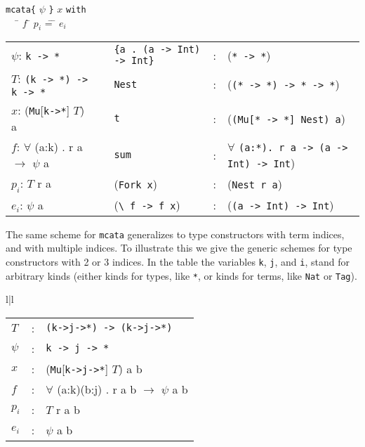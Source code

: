 {{\small
\begin{tabbing}
\verb+mcata{+ $\psi$ \verb+}+  $x$ \verb+with+ \\
\verb+  + \= $f$ \= $p_{i}$ \= =  \= $e_{i}$ \\
\end{tabbing}
\vspace*{-.15in}
\begin{tabular}{l|clcl}
$\psi$: \verb+k -> *+          & & \verb+{a . (a -> Int) -> Int}+ & : & (\verb+* -> *+)\\
$T$: \verb+(k -> *) -> k -> *+ & & \verb+Nest+ & : & (\verb+(* -> *) -> * -> *+) \\
$x$: (\verb+Mu+[\verb+k->*+] $T$) a        & & \verb+t+ & : & (\verb+(Mu[* -> *] Nest) a+) \\
$f$: $\forall$ (a:k) . r a $\to$ $\psi$ a & & \verb+sum+ & : & $\forall$ \verb+(a:*). r a -> (a -> Int) -> Int+) \\
$p_{i}$: $T$ r a                 & & (\verb+Fork x+) & : & (\verb+Nest r a+) \\
$e_{i}$: $\psi$ a     & & (\verb+\ f -> f x+) & : & (\verb+(a -> Int) -> Int+) \\
\end{tabular}
}  
\vspace*{0.08in}

The same scheme for \verb+mcata+ generalizes to type constructors with term indices, and with multiple
indices. To illustrate this we give the generic schemes for type constructors
with 2 or 3 indices. In the table the variables \verb+k+, \verb+j+, and \verb+i+,
stand for arbitrary kinds (either kinds for types, like \verb+*+, or kinds for terms, like \verb+Nat+
or \verb+Tag+).

\vspace*{0.05in}
{\small
\begin{tabular}{l|l}
\begin{minipage}[l]{.45\linewidth}
\begin{tabular}{lcl}
$T$ & : & \verb+(k->j->*) -> (k->j->*)+ \\
$\psi$ & : & \verb+k -> j -> *+               \\ 
$x$ & : & (\verb+Mu+[\verb+k->j->*+] $T$) a b        \\
$f$ & : & $\forall$ (a:k)(b:j) . r a b $\to$ $\psi$ a b \\
$p_{i}$ & : & $T$ r a b             \\
$e_{i}$ & : & $\psi$ a b   \\
\end{tabular}
\end{minipage}


\end{tabular}}}
